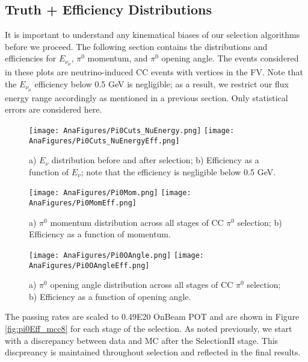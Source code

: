 \documentclass[12pt]{article}
\begin{document}
\subsection{Truth + Efficiency Distributions}
It is important to understand any kinematical biases of our selection algorithms before we proceed. The following section contains the distributions and efficiencies for $E_{\nu_{\mu}}$, $\pi^0$ momentum, and $\pi^0$ opening angle. The events considered in these plots are neutrino-induced CC events with vertices in the FV. Note that the $E_{\nu_{\mu}}$ efficiency below 0.5 GeV is negligible; as a result, we restrict our flux energy range accordingly as mentioned in a previous section. Only statistical errors are considered here. 

\begin{figure}[h!]
\centering
\texttt{[image: AnaFigures/Pi0Cuts\_NuEnergy.png]}
\hspace{1 mm}
\texttt{[image: AnaFigures/Pi0Cuts\_NuEnergyEff.png]}
\caption{a) $E_\nu$ distribution before and after selection; b) Efficiency as a function of $E_\nu$; note that the efficiency is negligible below 0.5 GeV.}
\label{fig:pi0_effs_0}
\end{figure}

\begin{figure}[h!]
\centering
\texttt{[image: AnaFigures/Pi0Mom.png]}
\hspace{1 mm}
\texttt{[image: AnaFigures/Pi0MomEff.png]}
\caption{a) $\pi^0$ momentum distribution across all stages of CC $\pi^0$ selection; b) Efficiency as a function of momentum. }
\label{fig:pi0_effs_1}
\end{figure}

\begin{figure}[h!]
\texttt{[image: AnaFigures/Pi0OAngle.png]}
\hspace{3 mm}
\texttt{[image: AnaFigures/Pi0OAngleEff.png]}
\caption{a) $\pi^0$ opening angle distribution across all stages of CC $\pi^0$ selection; b) Efficiency as a function of opening angle. }
\label{fig:pi0_effs_2}
\end{figure}

The passing rates are scaled to 0.49E20 OnBeam POT and are shown in Figure \ref{fig:pi0Eff_mcc8} for each stage of the selection. As noted previously, we start with a discrepancy between data and MC after the SelectionII stage.  This discpreancy is maintained throughout selection and reflected in the final results. 
\end{document}
